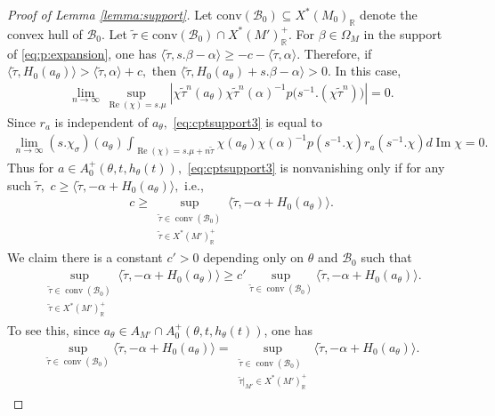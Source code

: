 \documentclass[10pt]{amsart}
\theoremstyle{definition}
\numberwithin{equation}{section}
\numberwithin{equation}{subsection}
\newcommand{\RR}{\mathbb{R}}
\renewcommand{\Im}{\mathop{\mathrm{Im}}}
\renewcommand{\Re}{\mathop{\mathrm{Re}}}
\begin{document}
\begin{proof}[Proof of Lemma \ref{lemma:support}]
Let $\mathrm{conv}(\mathcal{B}_0)\subseteq X^*(M_0)_\RR$ denote the convex hull of $\mathcal{B}_0$. Let $\tilde{\tau}\in \mathrm{conv}(\mathcal{B}_0)\cap X^*(M')_\RR^+$. For $\beta\in \Omega_M$ in the support of \eqref{eq:p:expansion}, one has $ \langle \tilde{\tau},s.\beta-\alpha\rangle\ge -c-\langle \tilde{\tau},\alpha\rangle.$ Therefore, if $\langle \tilde{\tau},H_0(a_\theta)\rangle>  \langle \tilde{\tau},\alpha\rangle+c,$ then $\langle \tilde{\tau},H_0(a_\theta)+s.\beta-\alpha\rangle>0.$ In this case, 
\begin{align*}
    \lim_{n\to \infty}\sup_{\Re(\chi)=s.\mu} \left|\chi \tilde{\tau}^n(a_\theta)\chi\tilde{\tau}^n(\alpha)^{-1}p\big(s^{-1}.(\chi\tilde{\tau}^n)\big)\right|=0.
\end{align*}
Since $r_a$ is independent of $a_\theta,$ \eqref{eq:cptsupport3} is equal to
\begin{align*}
    \lim_{n\to \infty}(s.\chi_\sigma)(a_\theta)\int_{\Re(\chi)=s.\mu+n\tilde{\tau}} \chi(a_\theta)\chi(\alpha)^{-1}p(s^{-1}.\chi)r_a(s^{-1}.\chi) d\Im\chi=0.
\end{align*}
Thus for $a\in A_0^+(\theta,t,h_
\theta(t)),$ \eqref{eq:cptsupport3} is nonvanishing only if for any such $\tilde{\tau},$ $c\geq \langle \tilde{\tau},-\alpha+H_0(a_\theta)\rangle,$ i.e.,
\begin{align*}
    c\geq \sup_{\substack{\tilde{\tau}\in\mathop{\mathrm{conv}}(\mathcal{B}_0)\\\tilde{\tau}\in X^*(M')^+_\mathbb{R}}}\langle \tilde{\tau},-\alpha+H_0(a_\theta)\rangle.
\end{align*}
We claim there is a constant $c'>0$ depending only on $\theta$ and $\mathcal{B}_0$ such that
\begin{align*}
     \sup_{\substack{\tilde{\tau}\in\mathop{\mathrm{conv}}(\mathcal{B}_0)\\\tilde{\tau}\in X^*(M')^+_\mathbb{R}}}\langle \tilde{\tau},-\alpha+H_0(a_\theta)\rangle\ge c'\sup_{\tilde{\tau}\in\mathop{\mathrm{conv}}(\mathcal{B}_0)}\langle \tilde{\tau},-\alpha+H_0(a_\theta)\rangle.
\end{align*}
To see this, since $a_\theta\in A_{M'}\cap A_0^+(\theta,t,h_\theta(t))$, one has 
\begin{align*}
    \sup_{\tilde{\tau}\in\mathop{\mathrm{conv}}(\mathcal{B}_0)}\langle \tilde{\tau},-\alpha+H_0(a_\theta)\rangle = \sup_{\substack{\tilde{\tau}\in\mathop{\mathrm{conv}}(\mathcal{B}_0)\\\tilde{\tau}\vert_{M'}\in X^*(M')^+_\RR}}\langle \tilde{\tau},-\alpha+H_0(a_\theta)\rangle.
\end{align*}


\end{proof}
\end{document}
